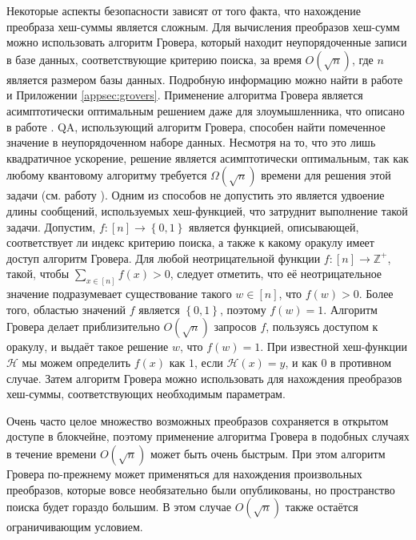 \documentclass{mrl}
\begin{document}
Некоторые аспекты безопасности зависят от того факта, что нахождение преобраза хеш-суммы является сложным. Для вычисления преобразов хеш-сумм можно использовать алгоритм Гровера, который находит неупорядоченные записи в базе данных, соответствующие критерию поиска, за время $O(\sqrt{n})$, где $n$ является размером базы данных. Подробную информацию можно найти в работе \cite{grover1996fast} и Приложении \ref{appsec:grovers}. Применение алгоритма Гровера является асимптотически оптимальным решением даже для злоумышленника, что описано в работе \cite{bennett1997strengths}. QA, использующий алгоритм Гровера, способен найти помеченное значение в неупорядоченном наборе данных. Несмотря на то, что это лишь квадратичное ускорение, решение является асимптотически оптимальным, так как любому квантовому алгоритму требуется $\Omega(\sqrt{n})$ времени для решения этой задачи (см. работу \cite{bennett1997strengths}). Одним из способов не допустить это является удвоение длины сообщений, используемых хеш-функцией, что затруднит выполнение такой задачи.
Допустим, $f:\left[n\right] \to \left\{0,1\right\}$ является функцией, описывающей, соответствует ли индекс критерию поиска, а также к какому оракулу имеет доступ алгоритм Гровера. Для любой неотрицательной функции $f:\left[n\right] \to \mathbb{Z}^+$, такой, чтобы $\sum_{x \in \left[n\right]} f(x) > 0$, следует отметить, что её неотрицательное значение подразумевает существование такого $w \in \left[n\right]$, что $f(w) > 0$. Более того, областью значений $f$ является $\left\{0,1\right\}$, поэтому $f(w) = 1$. Алгоритм Гровера делает приблизительно $O(\sqrt{n})$ запросов $f$, пользуясь доступом к оракулу, и выдаёт такое решение $w$, что $f(w) = 1$. При известной хеш-функции $\mathcal{H}$ мы можем определить $f(x)$ как $1$, если $\mathcal{H}(x) = y$, и как $0$ в противном случае. Затем алгоритм Гровера можно использовать для нахождения преобразов хеш-суммы, соответствующих необходимым параметрам.

Очень часто целое множество возможных преобразов сохраняется в открытом доступе в блокчейне, поэтому применение алгоритма Гровера в подобных случаях в течение времени $O(\sqrt{n})$ может быть очень быстрым. При этом алгоритм Гровера по-прежнему может применяться для нахождения произвольных преобразов, которые вовсе необязательно были опубликованы, но пространство поиска будет гораздо большим. В этом случае $O(\sqrt{n})$ также остаётся ограничивающим условием.
\end{document}
